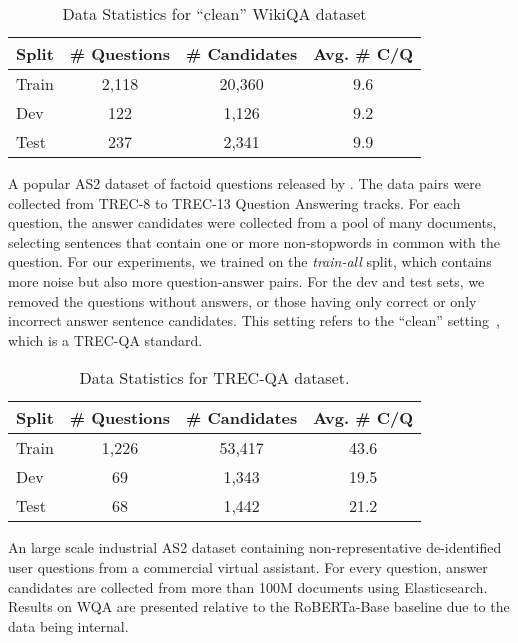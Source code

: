 \begin{table}[h!]
\centering
\small
\begin{tabular}{lccc}
\hline
    \textbf{Split} & \textbf{\# Questions} & \textbf{\# Candidates} & \textbf{Avg. \# C/Q} \\
    \hline
    Train   & 2,118 & 20,360     & 9.6 \\
    Dev     & 122   & 1,126      & 9.2 \\
    Test    & 237   & 2,341      & 9.9 \\
    \hline
\end{tabular}
\caption{Data Statistics for ``clean'' WikiQA dataset}
\vspace{1em}
\label{tab:wikiqa}
\end{table}


 A popular AS2 dataset of factoid questions released by \citeauthor{wang-etal-2007-jeopardy}. The data pairs were collected from TREC-8 to TREC-13 Question Answering tracks. For each question, the answer candidates were collected from a pool of many documents, selecting sentences that contain one or more non-stopwords in common with the question. For our experiments, we trained on the \textit{train-all} split, which contains more noise but also more question-answer pairs. For the dev and test sets, we removed the questions without answers, or those having only correct or only incorrect answer sentence candidates. This setting refers to the ``clean'' setting~\cite{shen-etal-2017-inter}, which is a TREC-QA standard.

\begin{table}[h!]
\centering
\small
\begin{tabular}{lccc}
\hline
    \textbf{Split} & \textbf{\# Questions} & \textbf{\# Candidates} & \textbf{Avg. \# C/Q} \\
    \hline
    Train   & 1,226 & 53,417     & 43.6 \\
    Dev     & 69    & 1,343      & 19.5 \\
    Test    & 68    & 1,442      & 21.2 \\
    \hline
\end{tabular}
\caption{Data Statistics for TREC-QA dataset.}
\vspace{1em}
\label{tab:trecqa}
\end{table}


 An large scale industrial AS2 dataset containing non-representative de-identified user questions from a commercial virtual assistant. For every question,  answer candidates are collected from more than 100M documents using Elasticsearch. Results on WQA are presented relative to the RoBERTa-Base baseline due to the data being internal.

